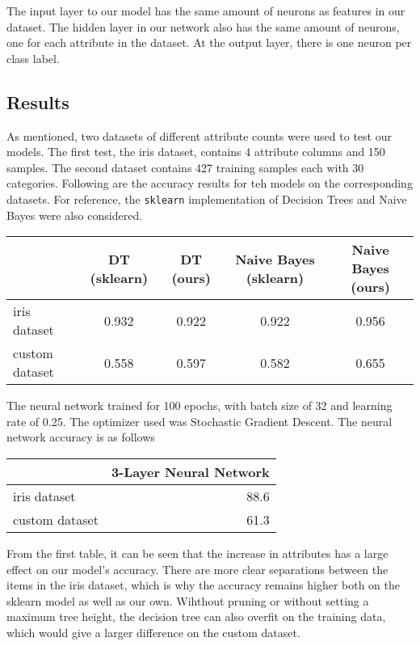 \documentclass[
  paper=a4,
,captions=tableheading
]{scrartcl}
\newcommand{\passthrough}[1]{#1}
\begin{document}
The input layer to our model has the same amount of neurons as features
in our dataset. The hidden layer in our network also has the same amount
of neurons, one for each attribute in the dataset. At the output layer,
there is one neuron per class label.

\hypertarget{results}{%
\subsection{Results}\label{results}}

As mentioned, two datasets of different attribute counts were used to
test our models. The first test, the iris dataset, contains 4 attribute
columns and 150 samples. The second dataset contains 427 training
samples each with 30 categories. Following are the accuracy results for
teh models on the corresponding datasets. For reference, the
\passthrough{\lstinline!sklearn!} implementation of Decision Trees and
Naive Bayes were also considered.

\begin{longtable}[]{@{}lcccc@{}}
\toprule
& DT (sklearn) & DT (ours) & Naive Bayes (sklearn) & Naive Bayes
(ours) \\
\midrule
\endhead
iris dataset & 0.932 & 0.922 & 0.922 & 0.956 \\
custom dataset & 0.558 & 0.597 & 0.582 & 0.655 \\
\bottomrule
\end{longtable}

The neural network trained for 100 epochs, with batch size of 32 and
learning rate of 0.25. The optimizer used was Stochastic Gradient
Descent. The neural network accuracy is as follows

\begin{longtable}[]{@{}lr@{}}
\toprule
& 3-Layer Neural Network \\
\midrule
\endhead
iris dataset & 88.6 \\
custom dataset & 61.3 \\
\bottomrule
\end{longtable}

From the first table, it can be seen that the increase in attributes has
a large effect on our model's accuracy. There are more clear separations
between the items in the iris dataset, which is why the accuracy remains
higher both on the sklearn model as well as our own. Wihthout pruning or
without setting a maximum tree height, the decision tree can also
overfit on the training data, which would give a larger difference on
the custom dataset.
\end{document}
